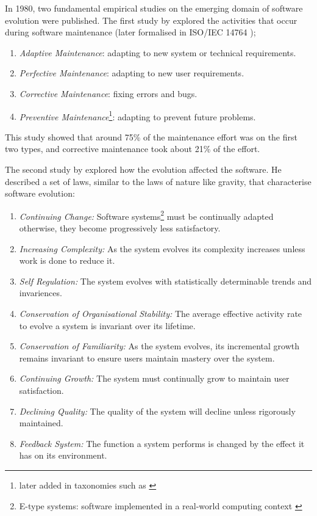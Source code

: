 In 1980, two fundamental empirical studies on the emerging domain of software evolution were published.
The first study by \cite{Lientz1980} explored the activities that occur during software maintenance (later formalised in ISO/IEC 14764 \citep{IsoIec2006});
\begin{enumerate}
	\item \textit{Adaptive Maintenance}: adapting to new system or technical requirements.
	\item \textit{Perfective Maintenance}: adapting to new user requirements.
	\item \textit{Corrective Maintenance}: fixing errors and bugs.
	\item \textit{Preventive Maintenance}\footnote{later added in taxonomies such as \citep{iee1990ieee}}: adapting to prevent future problems.
\end{enumerate} 

This study showed that around 75\% of the maintenance effort was on the first two types, and corrective maintenance took about 21\% of the effort.

The second study by \cite{lehman1980} explored how the evolution affected the software.
He described a set of laws, similar to the laws of nature like gravity, that characterise software evolution:
\begin{enumerate}
  \item \textit{Continuing Change:} Software systems\footnote{E-type systems: software implemented in a real-world computing context \citep{lehman1980}} must be continually adapted 
  otherwise, they become progressively less satisfactory.
  \item \textit{Increasing Complexity:} As the system evolves its complexity increases unless work is done to reduce it.
  \item \textit{Self Regulation:} The system evolves with statistically determinable trends and invariences.
  \item \textit{Conservation of Organisational Stability:} The average effective activity rate to evolve a system is invariant over its lifetime.
  \item \textit{Conservation of Familiarity:} As the system evolves, its incremental growth remains invariant to ensure users maintain mastery over the system.
  \item \textit{Continuing Growth:} The system must continually grow to maintain user satisfaction.
  \item \textit{Declining Quality:} The quality of the system will decline unless rigorously maintained.
  \item \textit{Feedback System:} The function a system performs is changed by the effect it has on its environment.
\end{enumerate}

